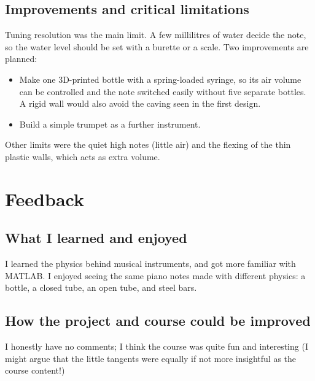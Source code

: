 \documentclass[11pt]{article}
\begin{document}
\subsection{Improvements and critical limitations}

Tuning resolution was the main limit. A few millilitres of water decide the note, so the water level should be set with a burette or a scale. Two improvements are planned:
\begin{itemize}
\item Make one 3D-printed bottle with a spring-loaded syringe, so its air volume can be controlled and the note switched easily without five separate bottles. A rigid wall would also avoid the caving seen in the first design.
\item Build a simple trumpet as a further instrument.
\end{itemize}
Other limits were the quiet high notes (little air) and the flexing of the thin plastic walls, which acts as extra volume.

\section{Feedback}

\subsection{What I learned and enjoyed}

I learned the physics behind musical instruments, and got more familiar with MATLAB. I enjoyed seeing the same piano notes made with different physics: a bottle, a closed tube, an open tube, and steel bars.

\subsection{How the project and course could be improved}

I honestly have no comments; I think the course was quite fun and interesting (I might argue that the little tangents were equally if not more insightful as the course content!)
\end{document}
